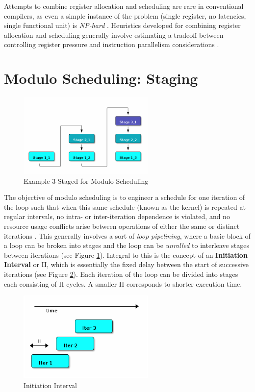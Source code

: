 \documentclass[12pt]{report}
\begin{document}
Attempts to combine register allocation and scheduling are rare in
conventional compilers, as even a simple instance of the problem (single
register, no latencies, single functional unit) is \emph{NP-hard}
\parencite{motwani1995combining} \parencite{Pinter:1993:RAI:173262.155114}.
Heuristics developed for combining register allocation and scheduling
generally involve estimating a tradeoff between controlling register pressure
and instruction parallelism considerations \parencite{motwani1995combining}.

\section{Modulo Scheduling: Staging}
\label{sec:orge29af3f}
\begin{figure}[htbp]
\centering
\includegraphics[width=0.6\textwidth]{figures/SwingModuloStaging.png}
\caption{\label{fig:SwingStaging}
Example 3-Staged for Modulo Scheduling}
\end{figure}

The objective of modulo scheduling is to engineer a schedule for one
iteration of the loop such that when this same schedule (known as the kernel)
is repeated at regular intervals, no intra- or inter-iteration dependence is
violated, and no resource usage conflicts arise between operations of either
the same or distinct iterations \parencite{rau1996iterative}. This generally
involves a sort of \emph{loop pipelining}, where a basic block of a loop can be
broken into stages and the loop can be \emph{unrolled} to interleave stages
between iterations (see Figure \ref{fig:SwingStaging}). Integral to this is the
concept of an \textbf{Initiation Interval} or II, which is essentially the fixed
delay between the start of successive iterations (see Figure
\ref{fig:InitiationInterval}). Each iteration of the loop can be divided into
stages each consisting of II cycles. A smaller II corresponds to shorter
execution time.

\begin{figure}[htbp]
\centering
\includegraphics[width=0.6\textwidth]{figures/InitiationInterval.png}
\caption{\label{fig:InitiationInterval}
Initiation Interval}
\end{figure}
\end{document}
